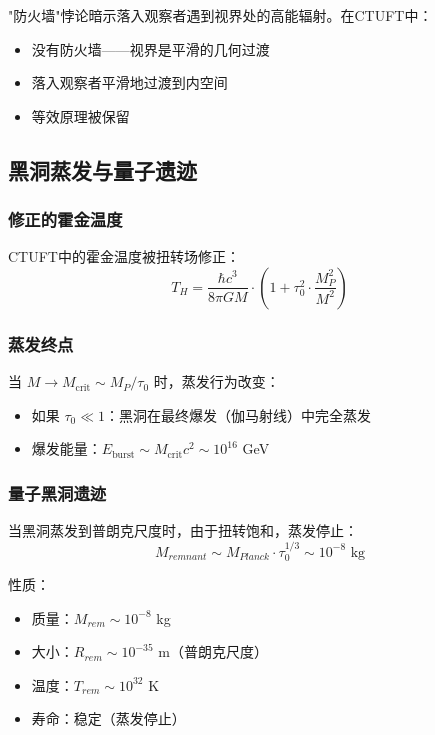 "防火墙"悖论暗示落入观察者遇到视界处的高能辐射。在CTUFT中：
\begin{itemize}
    \item 没有防火墙——视界是平滑的几何过渡
    \item 落入观察者平滑地过渡到内空间
    \item 等效原理被保留
\end{itemize}

\subsection{黑洞蒸发与量子遗迹}

\subsubsection{修正的霍金温度}

CTUFT中的霍金温度被扭转场修正：
\begin{equation}
    T_H = \frac{\hbar c^3}{8\pi G M} \cdot \left(1 + \tau_0^2 \cdot \frac{M_P^2}{M^2}\right)
\end{equation}

\subsubsection{蒸发终点}

\begin{theorem}[黑洞终点是遗迹或爆发]
当 $M \to M_{\text{crit}} \sim M_P/\tau_0$ 时，蒸发行为改变：
\begin{itemize}
    \item 如果 $\tau_0 \ll 1$：黑洞在最终爆发（伽马射线）中完全蒸发
    \item 爆发能量：$E_{\text{burst}} \sim M_{\text{crit}} c^2 \sim 10^{16}$ GeV
\end{itemize}
\end{theorem}

\subsubsection{量子黑洞遗迹}

当黑洞蒸发到普朗克尺度时，由于扭转饱和，蒸发停止：
\begin{equation}
    M_{remnant} \sim M_{Planck} \cdot \tau_0^{1/3} \sim 10^{-8} \text{ kg}
\end{equation}

性质：
\begin{itemize}
    \item 质量：$M_{rem} \sim 10^{-8}$ kg
    \item 大小：$R_{rem} \sim 10^{-35}$ m（普朗克尺度）
    \item 温度：$T_{rem} \sim 10^{32}$ K
    \item 寿命：稳定（蒸发停止）
\end{itemize}

